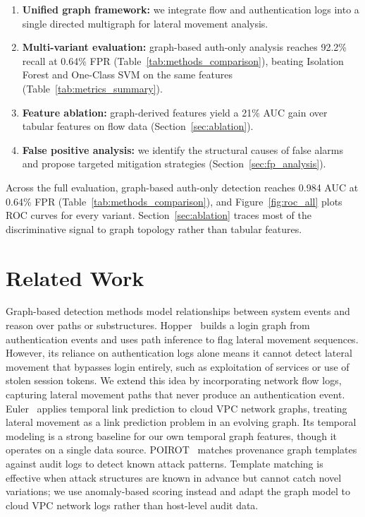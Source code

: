 \documentclass[letterpaper,twocolumn,10pt]{article}
\begin{document}
\begin{enumerate}
\item \textbf{Unified graph framework:} we integrate flow and authentication logs into a single directed multigraph for lateral movement analysis.
\item \textbf{Multi-variant evaluation:} graph-based auth-only analysis reaches 92.2\% recall at 0.64\% FPR (Table~\ref{tab:methods_comparison}), beating Isolation Forest and One-Class SVM on the same features (Table~\ref{tab:metrics_summary}).
\item \textbf{Feature ablation:} graph-derived features yield a 21\% AUC gain over tabular features on flow data (Section~\ref{sec:ablation}).
\item \textbf{False positive analysis:} we identify the structural causes of false alarms and propose targeted mitigation strategies (Section~\ref{sec:fp_analysis}).
\end{enumerate}

Across the full evaluation, graph-based auth-only detection reaches 0.984 AUC at 0.64\% FPR (Table~\ref{tab:methods_comparison}), and Figure~\ref{fig:roc_all} plots ROC curves for every variant. Section~\ref{sec:ablation} traces most of the discriminative signal to graph topology rather than tabular features.

\section{Related Work}

Graph-based detection methods model relationships between system events and reason over paths or substructures. Hopper~\cite{hopper2021} builds a login graph from authentication events and uses path inference to flag lateral movement sequences. However, its reliance on authentication logs alone means it cannot detect lateral movement that bypasses login entirely, such as exploitation of services or use of stolen session tokens. We extend this idea by incorporating network flow logs, capturing lateral movement paths that never produce an authentication event. Euler~\cite{euler2023} applies temporal link prediction to cloud VPC network graphs, treating lateral movement as a link prediction problem in an evolving graph. Its temporal modeling is a strong baseline for our own temporal graph features, though it operates on a single data source. POIROT~\cite{poirot2019} matches provenance graph templates against audit logs to detect known attack patterns. Template matching is effective when attack structures are known in advance but cannot catch novel variations; we use anomaly-based scoring instead and adapt the graph model to cloud VPC network logs rather than host-level audit data.
\end{document}
